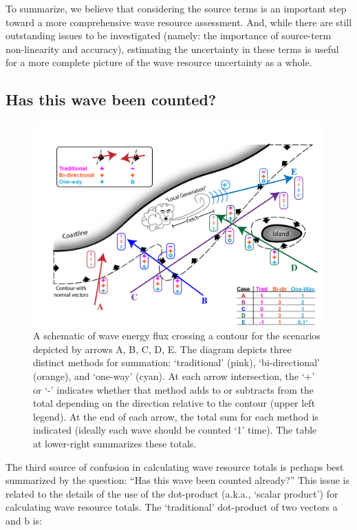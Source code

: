 To summarize, we believe that considering the source terms is an important step toward a more comprehensive wave resource assessment. And, while there are still outstanding issues to be investigated (namely: the importance of source-term non-linearity and accuracy), estimating the uncertainty in these terms is useful for a more complete picture of the wave resource uncertainty as a whole.

\subsection{Has this wave been counted?}

\begin{figure}[ht]
  \centering
  \includegraphics[width=\linewidth]{../diagram/schematic03.png}
  \caption{A schematic of wave energy flux crossing a contour for the scenarios depicted by arrows A, B, C, D, E. The diagram depicts three distinct methods for summation: ‘traditional’ (pink), ‘bi-directional’ (orange), and ‘one-way’ (cyan). At each arrow intersection, the ‘+’ or ‘-’ indicates whether that method adds to or subtracts from the total depending on the direction relative to the contour (upper left legend). At the end of each arrow, the total sum for each method is indicated (ideally each wave should be counted ‘1’ time). The table at lower-right summarizes these totals.}
  \label{fig:wave-counting}
\end{figure}

The third source of confusion in calculating wave resource totals is perhaps best summarized by the question: “Has this wave been counted already?” This issue is related to the details of the use of the dot-product (a.k.a., ‘scalar product’) for calculating wave resource totals. The ‘traditional’ dot-product of two vectors a and b is:

